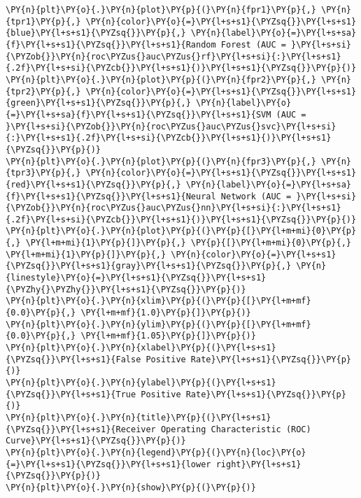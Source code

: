 \begin{tcolorbox}[breakable, size=fbox, boxrule=1pt, pad at break*=1mm,colback=cellbackground, colframe=cellborder]
\begin{Verbatim}[commandchars=\\\{\}]
\PY{n}{plt}\PY{o}{.}\PY{n}{plot}\PY{p}{(}\PY{n}{fpr1}\PY{p}{,} \PY{n}{tpr1}\PY{p}{,} \PY{n}{color}\PY{o}{=}\PY{l+s+s1}{\PYZsq{}}\PY{l+s+s1}{blue}\PY{l+s+s1}{\PYZsq{}}\PY{p}{,} \PY{n}{label}\PY{o}{=}\PY{l+s+sa}{f}\PY{l+s+s1}{\PYZsq{}}\PY{l+s+s1}{Random Forest (AUC = }\PY{l+s+si}{\PYZob{}}\PY{n}{roc\PYZus{}auc\PYZus{}rf}\PY{l+s+si}{:}\PY{l+s+s1}{.2f}\PY{l+s+si}{\PYZcb{}}\PY{l+s+s1}{)}\PY{l+s+s1}{\PYZsq{}}\PY{p}{)}
\PY{n}{plt}\PY{o}{.}\PY{n}{plot}\PY{p}{(}\PY{n}{fpr2}\PY{p}{,} \PY{n}{tpr2}\PY{p}{,} \PY{n}{color}\PY{o}{=}\PY{l+s+s1}{\PYZsq{}}\PY{l+s+s1}{green}\PY{l+s+s1}{\PYZsq{}}\PY{p}{,} \PY{n}{label}\PY{o}{=}\PY{l+s+sa}{f}\PY{l+s+s1}{\PYZsq{}}\PY{l+s+s1}{SVM (AUC = }\PY{l+s+si}{\PYZob{}}\PY{n}{roc\PYZus{}auc\PYZus{}svc}\PY{l+s+si}{:}\PY{l+s+s1}{.2f}\PY{l+s+si}{\PYZcb{}}\PY{l+s+s1}{)}\PY{l+s+s1}{\PYZsq{}}\PY{p}{)}
\PY{n}{plt}\PY{o}{.}\PY{n}{plot}\PY{p}{(}\PY{n}{fpr3}\PY{p}{,} \PY{n}{tpr3}\PY{p}{,} \PY{n}{color}\PY{o}{=}\PY{l+s+s1}{\PYZsq{}}\PY{l+s+s1}{red}\PY{l+s+s1}{\PYZsq{}}\PY{p}{,} \PY{n}{label}\PY{o}{=}\PY{l+s+sa}{f}\PY{l+s+s1}{\PYZsq{}}\PY{l+s+s1}{Neural Network (AUC = }\PY{l+s+si}{\PYZob{}}\PY{n}{roc\PYZus{}auc\PYZus{}nn}\PY{l+s+si}{:}\PY{l+s+s1}{.2f}\PY{l+s+si}{\PYZcb{}}\PY{l+s+s1}{)}\PY{l+s+s1}{\PYZsq{}}\PY{p}{)}
\PY{n}{plt}\PY{o}{.}\PY{n}{plot}\PY{p}{(}\PY{p}{[}\PY{l+m+mi}{0}\PY{p}{,} \PY{l+m+mi}{1}\PY{p}{]}\PY{p}{,} \PY{p}{[}\PY{l+m+mi}{0}\PY{p}{,} \PY{l+m+mi}{1}\PY{p}{]}\PY{p}{,} \PY{n}{color}\PY{o}{=}\PY{l+s+s1}{\PYZsq{}}\PY{l+s+s1}{gray}\PY{l+s+s1}{\PYZsq{}}\PY{p}{,} \PY{n}{linestyle}\PY{o}{=}\PY{l+s+s1}{\PYZsq{}}\PY{l+s+s1}{\PYZhy{}\PYZhy{}}\PY{l+s+s1}{\PYZsq{}}\PY{p}{)}
\PY{n}{plt}\PY{o}{.}\PY{n}{xlim}\PY{p}{(}\PY{p}{[}\PY{l+m+mf}{0.0}\PY{p}{,} \PY{l+m+mf}{1.0}\PY{p}{]}\PY{p}{)}
\PY{n}{plt}\PY{o}{.}\PY{n}{ylim}\PY{p}{(}\PY{p}{[}\PY{l+m+mf}{0.0}\PY{p}{,} \PY{l+m+mf}{1.05}\PY{p}{]}\PY{p}{)}
\PY{n}{plt}\PY{o}{.}\PY{n}{xlabel}\PY{p}{(}\PY{l+s+s1}{\PYZsq{}}\PY{l+s+s1}{False Positive Rate}\PY{l+s+s1}{\PYZsq{}}\PY{p}{)}
\PY{n}{plt}\PY{o}{.}\PY{n}{ylabel}\PY{p}{(}\PY{l+s+s1}{\PYZsq{}}\PY{l+s+s1}{True Positive Rate}\PY{l+s+s1}{\PYZsq{}}\PY{p}{)}
\PY{n}{plt}\PY{o}{.}\PY{n}{title}\PY{p}{(}\PY{l+s+s1}{\PYZsq{}}\PY{l+s+s1}{Receiver Operating Characteristic (ROC) Curve}\PY{l+s+s1}{\PYZsq{}}\PY{p}{)}
\PY{n}{plt}\PY{o}{.}\PY{n}{legend}\PY{p}{(}\PY{n}{loc}\PY{o}{=}\PY{l+s+s1}{\PYZsq{}}\PY{l+s+s1}{lower right}\PY{l+s+s1}{\PYZsq{}}\PY{p}{)}
\PY{n}{plt}\PY{o}{.}\PY{n}{show}\PY{p}{(}\PY{p}{)}
\end{Verbatim}
\end{tcolorbox}

    \begin{center}
    \end{center}
    { \hspace*{\fill} \\}
    
